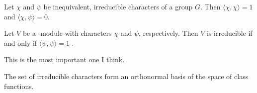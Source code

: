 \begin{theorem}
    Let $\chi$ and $\psi$ be inequivalent, irreducible characters of a group $G$.
    Then $\langle \chi, \chi \rangle = 1$ and $\langle \chi, \psi \rangle = 0$. 
\end{theorem}


\begin{theorem}
    Let $V$ be a \CG-module with characters $\chi$ and $\psi$, respectively. Then $V$ is irreducible if and only if 
    $\langle \psi, \psi \rangle = 1$ .
\end{theorem}


This is the most important one I think.
\begin{theorem}
    The set of irreducible characters form an orthonormal basis of the space of class functions.
\end{theorem}




















